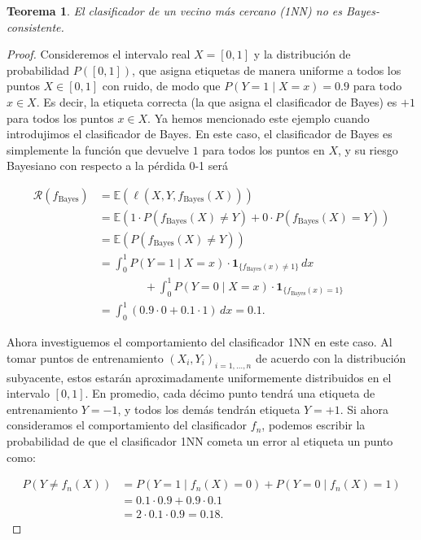 \documentclass{report}
\newtheorem{thm}{Teorema}[section]
\begin{document}
\begin{thm}
    El clasificador de un vecino más cercano (1NN) no es Bayes-consistente.
\end{thm}

\begin{proof}

Consideremos 
el intervalo real \(X = [0, 1]\) y la distribución de probabilidad \(P([0, 1])\),  que asigna etiquetas 
de manera uniforme a todos los puntos \(X \in [0, 1]\) con ruido, de modo que 
\(P(Y = 1 \mid X = x) = 0.9\) para todo \(x \in X\). Es decir, la etiqueta correcta (la que 
asigna el clasificador de Bayes) es \(+1\) para todos los puntos \(x \in X\). Ya hemos mencionado 
este ejemplo cuando introdujimos el clasificador de Bayes. En este caso, el clasificador de Bayes 
es simplemente la función que devuelve \(1\) para todos los puntos en \(X\), y su riesgo Bayesiano 
con respecto a la pérdida 0-1 será

\[
\begin{aligned}
    \mathcal{R}(f_{\text{Bayes}}) & = \mathbb{E}(\ell(X,Y,f_{\text{Bayes}}(X))) \\
    & = \mathbb{E}(1\cdot P(f_{\text{Bayes}}(X)\neq Y) + 0 \cdot P(f_{\text{Bayes}}(X) = Y))\\
    & = \mathbb{E}(P(f_{\text{Bayes}}(X)\neq Y))\\
    & = \int_{0}^{1} P(Y = 1 \mid X = x) \cdot \mathbf{1}_{\{f_{\text{Bayes}}(x) \neq 1\}} \, dx \\
    & \qquad \qquad + \int_{0}^{1} P(Y=0 \mid X=x) \cdot \mathbf{1}_{\{f_{\text{Bayes}}(x) = 1\}} \\
    & = \int_{0}^{1} (0.9 \cdot 0 + 0.1 \cdot 1) \, dx = 0.1.
\end{aligned}
\]

Ahora investiguemos el comportamiento del clasificador 1NN 
en este caso. Al tomar puntos de entrenamiento \((X_i, Y_i)_{i=1,\dots,n}\) de acuerdo con la 
distribución subyacente, estos estarán aproximadamente uniformemente distribuidos en el intervalo 
\([0, 1]\). En promedio, cada décimo punto tendrá una etiqueta de entrenamiento \(Y = -1\), y todos 
los demás tendrán etiqueta \(Y = +1\). Si ahora consideramos el comportamiento del clasificador \(f_n\), 
podemos escribir la probabilidad de que el clasificador 1NN cometa un error al etiqueta un punto como:

\[
\begin{aligned}
P(Y \neq f_n(X)) & = P(Y = 1 \mid f_n(X) = 0) + P(Y = 0 \mid f_n(X) = 1) \\
                 & = 0.1 \cdot 0.9 + 0.9 \cdot 0.1 \\
                 & = 2 \cdot 0.1 \cdot 0.9 = 0.18.
\end{aligned}
\]


\end{proof}
\end{document}
